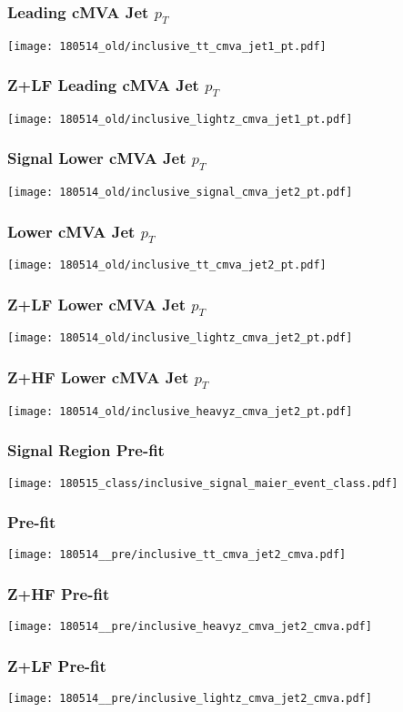 \begin{frame}
   \frametitle{\ttbar Leading cMVA Jet $p_T$}
   \centering
   \texttt{[image: 180514\_old/inclusive\_tt\_cmva\_jet1\_pt.pdf]}
\end{frame}

\begin{frame}
   \frametitle{Z+LF Leading cMVA Jet $p_T$}
   \centering
   \texttt{[image: 180514\_old/inclusive\_lightz\_cmva\_jet1\_pt.pdf]}
\end{frame}

\begin{frame}
   \frametitle{Signal Lower cMVA Jet $p_T$}
   \centering
   \texttt{[image: 180514\_old/inclusive\_signal\_cmva\_jet2\_pt.pdf]}
\end{frame}

\begin{frame}
   \frametitle{\ttbar Lower cMVA Jet $p_T$}
   \centering
   \texttt{[image: 180514\_old/inclusive\_tt\_cmva\_jet2\_pt.pdf]}
\end{frame}

\begin{frame}
   \frametitle{Z+LF Lower cMVA Jet $p_T$}
   \centering
   \texttt{[image: 180514\_old/inclusive\_lightz\_cmva\_jet2\_pt.pdf]}
\end{frame}

\begin{frame}
   \frametitle{Z+HF Lower cMVA Jet $p_T$}
   \centering
   \texttt{[image: 180514\_old/inclusive\_heavyz\_cmva\_jet2\_pt.pdf]}
\end{frame}

\begin{frame}
   \frametitle{Signal Region Pre-fit}
   \centering
   \texttt{[image: 180515\_class/inclusive\_signal\_maier\_event\_class.pdf]}
\end{frame}

\begin{frame}
   \frametitle{\ttbar Pre-fit}
   \centering
   \texttt{[image: 180514\_\_pre/inclusive\_tt\_cmva\_jet2\_cmva.pdf]}
\end{frame}

\begin{frame}
   \frametitle{Z+HF Pre-fit}
   \centering
   \texttt{[image: 180514\_\_pre/inclusive\_heavyz\_cmva\_jet2\_cmva.pdf]}
\end{frame}

\begin{frame}
   \frametitle{Z+LF Pre-fit}
   \centering
   \texttt{[image: 180514\_\_pre/inclusive\_lightz\_cmva\_jet2\_cmva.pdf]}
\end{frame}

